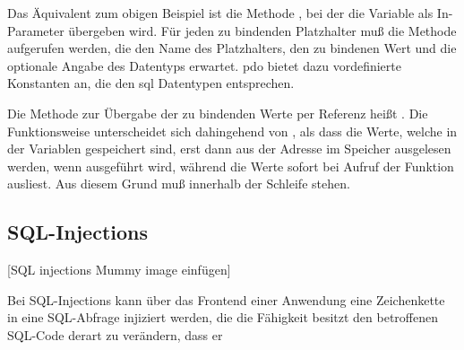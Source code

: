 Das Äquivalent zum obigen Beispiel ist die Methode , bei der die Variable als In-Parameter übergeben wird. Für jeden zu bindenden Platzhalter muß die Methode aufgerufen werden, die den Name des Platzhalters, den zu bindenen Wert und die optionale Angabe des Datentyps erwartet. \gls{pdo} bietet dazu vordefinierte Konstanten an, die den \gls{sql} Datentypen entsprechen.


Die Methode zur Übergabe der zu bindenden Werte per Referenz heißt . Die Funktionsweise unterscheidet sich dahingehend von , als dass die Werte, welche in der Variablen gespeichert sind, erst dann aus der Adresse im Speicher ausgelesen werden, wenn  ausgeführt wird, während  die Werte sofort bei Aufruf der Funktion ausliest. Aus diesem Grund muß  innerhalb der Schleife stehen.



\subsection{SQL-Injections}
\label{subsec:sqlInjections}
[SQL injections Mummy image einfügen]

Bei SQL-Injections kann über das Frontend einer Anwendung eine Zeichenkette in eine SQL-Abfrage injiziert werden, die die Fähigkeit besitzt den betroffenen SQL-Code derart zu verändern, dass er

